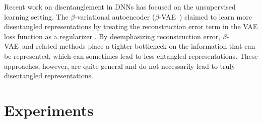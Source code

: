 \documentclass[10pt,letterpaper]{article}
\newcommand{\bvae}{$\beta$-VAE~}
\begin{document}
Recent work on disentanglement in DNNs has focused on the unsupervised learning setting. The $\beta$-variational autoencoder (\bvae) claimed to learn more disentangled representations by treating the reconstruction error term in the VAE loss function as a regularizer \cite{Higgins2017,Kingma2014}. By deemphasizing reconstruction error, \bvae and related methods \cite{Alemi2017,Mathieu2018} place a tighter bottleneck on the information that can be represented, which can sometimes lead to less entangled representations. These approaches, however, are quite general and do not necessarily lead to truly disentangled representations.


\section{Experiments}
\end{document}
